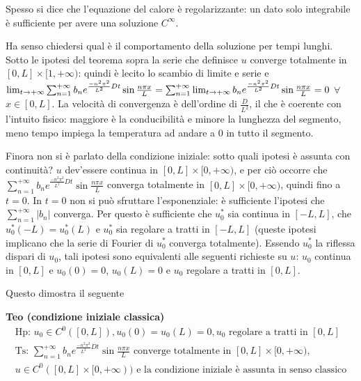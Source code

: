 \documentclass{article}
\begin{document}
Spesso si dice che l'equazione del calore \`{e} regolarizzante: un dato solo
integrabile \`{e} sufficiente per avere una soluzione $C^{\infty }$.

Ha senso chiedersi qual \`{e} il comportamento della soluzione per tempi
lunghi. Sotto le ipotesi del teorema sopra la serie che definisce $u$
converge totalmente in $\left[ 0,L\right] \times \lbrack 1,+\infty )$:
quindi \`{e} lecito lo scambio di limite e serie e $\lim_{t\rightarrow
+\infty }\sum_{n=1}^{+\infty }b_{n}e^{\frac{-n^{2}\pi ^{2}}{L^{2}}Dt}\sin 
\frac{n\pi x}{L}=\sum_{n=1}^{+\infty }\lim_{t\rightarrow +\infty }b_{n}e^{%
\frac{-n^{2}\pi ^{2}}{L^{2}}Dt}\sin \frac{n\pi x}{L}=0$ $\forall $ $x\in %
\left[ 0,L\right] $. La velocit\`{a} di convergenza \`{e} dell'ordine di $%
\frac{D}{L^{2}}$, il che \`{e} coerente con l'intuito fisico: maggiore \`{e}
la conducibilit\`{a} e minore la lunghezza del segmento, meno tempo impiega
la temperatura ad andare a $0$ in tutto il segmento.

Finora non si \`{e} parlato della condizione iniziale: sotto quali ipotesi 
\`{e} assunta con continuit\`{a}? $u$ dev'essere continua in $\left[ 0,L%
\right] \times \lbrack 0,+\infty )$, e per ci\`{o} occorre che $%
\sum_{n=1}^{+\infty }b_{n}e^{\frac{-n^{2}\pi ^{2}}{L^{2}}Dt}\sin \frac{n\pi x%
}{L}$ converga totalmente in $\left[ 0,L\right] \times \lbrack 0,+\infty )$,
quindi fino a $t=0$. In $t=0$ non si pu\`{o} sfruttare l'esponenziale: \`{e}
sufficiente l'ipotesi che $\sum_{n=1}^{+\infty }\left\vert b_{n}\right\vert $
converga. Per questo \`{e} sufficiente che $u_{0}^{\ast }$ sia continua in $%
\left[ -L,L\right] $, che $u_{0}^{\ast }\left( -L\right) =u_{0}^{\ast
}\left( L\right) $ e $u_{0}^{\ast }$ sia regolare a tratti in $\left[ -L,L%
\right] $ (queste ipotesi implicano che la serie di Fourier di $u_{0}^{\ast
} $ converga totalmente). Essendo $u_{0}^{\ast }$ la riflessa dispari di $%
u_{0} $, tali ipotesi sono equivalenti alle seguenti richieste su $u$: $%
u_{0} $ continua in $\left[ 0,L\right] $ e $u_{0}\left( 0\right) =0$, $%
u_{0}\left( L\right) =0$ e $u_{0}$ regolare a tratti in $\left[ 0,L\right] $.

Questo dimostra il seguente

\textbf{Teo (condizione iniziale classica)}%
\begin{gather*}
\text{Hp}\text{: }u_{0}\in C^{0}\left( \left[ 0,L\right] \right)
,u_{0}\left( 0\right) =u_{0}\left( L\right) =0,u_{0}\text{ regolare a tratti
in }\left[ 0,L\right] \\
\text{Ts}\text{: }\sum_{n=1}^{+\infty }b_{n}e^{\frac{-n^{2}\pi ^{2}}{L^{2}}%
Dt}\sin \frac{n\pi x}{L}\text{ converge totalmente in }\left[ 0,L\right]
\times \lbrack 0,+\infty )\text{,} \\
u\in C^{0}\left( [0,L]\times \lbrack 0,+\infty \right) )\text{ e la
condizione iniziale \`{e} assunta in senso classico}
\end{gather*}
\end{document}
